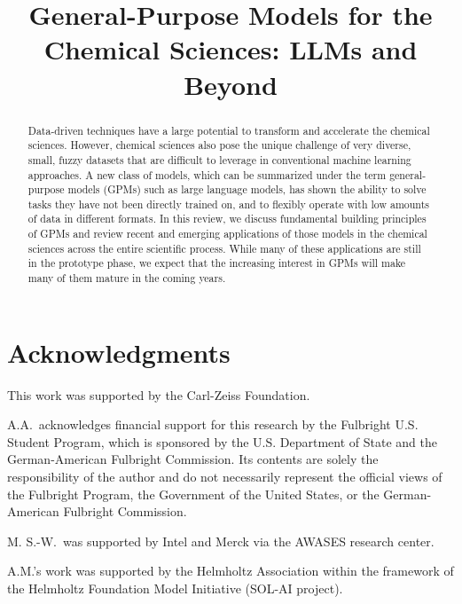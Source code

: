 \documentclass[11pt, oneside]{article}
\title{\textsf{General-Purpose Models for the Chemical Sciences: LLMs and Beyond}}
\begin{document}
\maketitle

\begin{abstract}
    \noindent Data-driven techniques have a large potential to transform and accelerate the chemical sciences. 
    However, chemical sciences also pose the unique challenge of very diverse, small, fuzzy datasets that are difficult to leverage in conventional machine learning approaches. 
    A new class of models, which can be summarized under the term general-purpose models (GPMs) such as large language models, has shown the ability to solve tasks they have not been directly trained on, and to flexibly operate with low amounts of data in different formats.
    In this review, we discuss fundamental building principles of GPMs and review recent and emerging applications of those models in the chemical sciences across the entire scientific process.
    While many of these applications are still in the prototype phase, we expect that the increasing interest in GPMs will make many of them mature in the coming years. 
\end{abstract}
\pagebreak
\tableofcontents

\clearpage 

  






\section*{Acknowledgments}

This work was supported by the Carl-Zeiss Foundation. 

\noindent A.A.\ acknowledges financial support for this research by the Fulbright U.S. Student Program, which is sponsored by the U.S. Department of State and the German-American Fulbright Commission. Its contents are solely the responsibility of the author and do not necessarily represent the official views of the Fulbright Program, the Government of the United States, or the German-American Fulbright Commission. 
 
\noindent M. S.-W.\ was supported by Intel and Merck via the AWASES research center. 

\noindent A.M.'s work was supported by the Helmholtz Association within the framework of the Helmholtz Foundation Model Initiative (SOL-AI project).
\end{document}
